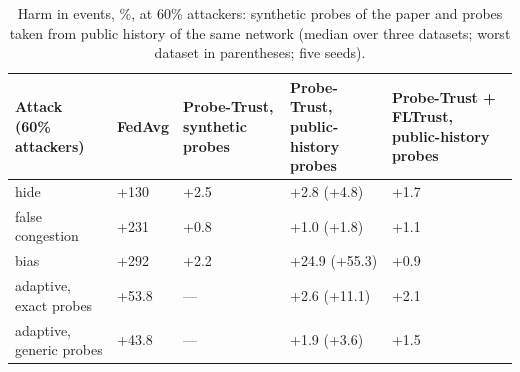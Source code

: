 \documentclass[journal]{IEEEtran}
\begin{document}
\begin{table}[!t]
\caption{Harm in events, \%, at 60\% attackers: synthetic probes of the paper and probes taken from public history of the same network (median over three datasets; worst dataset in parentheses; five seeds).}
\centering
\footnotesize
\renewcommand{\arraystretch}{1.12}
\begin{tabular}{|>{\raggedright\arraybackslash}p{3.61cm}|>{\raggedright\arraybackslash}p{1.68cm}|>{\raggedright\arraybackslash}p{3.03cm}|>{\raggedright\arraybackslash}p{3.42cm}|>{\raggedright\arraybackslash}p{4.00cm}|}
\hline
\textbf{Attack (60\% attackers)} & \textbf{FedAvg} & \textbf{Probe-Trust, synthetic probes} & \textbf{Probe-Trust, public-history probes} & \textbf{Probe-Trust + FLTrust, public-history probes} \\
\hline
hide & +130 & +2.5 & +2.8 (+4.8) & +1.7 \\
\hline
false congestion & +231 & +0.8 & +1.0 (+1.8) & +1.1 \\
\hline
bias & +292 & +2.2 & +24.9 (+55.3) & +0.9 \\
\hline
adaptive, exact probes & +53.8 & --- & +2.6 (+11.1) & +2.1 \\
\hline
adaptive, generic probes & +43.8 & --- & +1.9 (+3.6) & +1.5 \\
\hline
\end{tabular}
\end{table}
\end{document}
